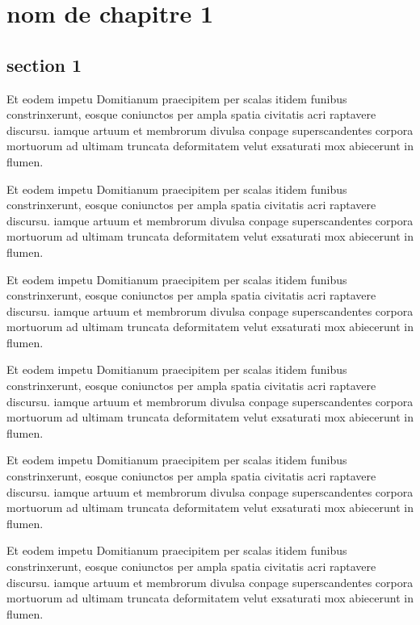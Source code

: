\chapter{nom de chapitre 1}


\section{section 1}
Et eodem impetu \cite{ref1}Domitianum praecipitem per scalas itidem funibus constrinxerunt, eosque coniunctos per ampla spatia civitatis acri raptavere discursu. iamque artuum et membrorum divulsa conpage superscandentes corpora mortuorum ad ultimam truncata deformitatem velut \cite{ref2} exsaturati mox abiecerunt in flumen.

Et eodem impetu \cite{ref1}Domitianum praecipitem per scalas itidem funibus constrinxerunt, eosque coniunctos per ampla spatia civitatis acri raptavere discursu. iamque artuum et membrorum divulsa conpage superscandentes corpora mortuorum ad ultimam truncata deformitatem velut \cite{ref2} exsaturati mox abiecerunt in flumen.

Et eodem impetu \cite{ref1}Domitianum praecipitem per scalas itidem funibus constrinxerunt, eosque coniunctos per ampla spatia civitatis acri raptavere discursu. iamque artuum et membrorum divulsa conpage superscandentes corpora mortuorum ad ultimam truncata deformitatem velut \cite{ref2} exsaturati mox abiecerunt in flumen.

Et eodem impetu \cite{ref1}Domitianum praecipitem per scalas itidem funibus constrinxerunt, eosque coniunctos per ampla spatia civitatis acri raptavere discursu. iamque artuum et membrorum divulsa conpage superscandentes corpora mortuorum ad ultimam truncata deformitatem velut \cite{ref2} exsaturati mox abiecerunt in flumen.

Et eodem impetu \cite{ref1}Domitianum praecipitem per scalas itidem funibus constrinxerunt, eosque coniunctos per ampla spatia civitatis acri raptavere discursu. iamque artuum et membrorum divulsa conpage superscandentes corpora mortuorum ad ultimam truncata deformitatem velut \cite{ref2} exsaturati mox abiecerunt in flumen.


Et eodem impetu \cite{ref1}Domitianum praecipitem per scalas itidem funibus constrinxerunt, eosque coniunctos per ampla spatia civitatis acri raptavere discursu. iamque artuum et membrorum divulsa conpage superscandentes corpora mortuorum ad ultimam truncata deformitatem velut \cite{ref2} exsaturati mox abiecerunt in flumen.

